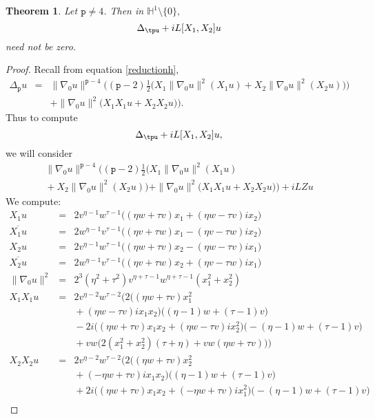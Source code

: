\documentclass[12pt]{amsart}
\theoremstyle{plain}
\newtheorem{theorem}{Theorem}[section]
\theoremstyle{definition}
\numberwithin{equation}{section}
\begin{document}
\begin{theorem} \label{negh}
Let ${\texttt{p}} \neq 4$. Then in $\mathbb{H}^1 \setminus \{0\},$ $$\Delta_\tpu+iL[X_1,X_2]u$$ need not be zero.
\end{theorem}
\begin{proof}
Recall from equation \eqref{reductionh}, 
\begin{eqnarray*}
\Delta_{\texttt{p}} u & = & \|\nabla_{0} u\|^{{\texttt{p}}-4}\bigg(({\texttt{p}}-2)\frac{1}{2}
\Big(X_1\|\nabla_0u\|^2(X_1u)+X_2\|\nabla_0u\|^2(X_2u)\Big)\bigg) \\
&& \mbox{}+\|\nabla_{0} u\|^{2}\big(X_1X_1u+X_2X_2u\big)\bigg).
\end{eqnarray*}
Thus to compute $$\Delta_\tpu+iL[X_1,X_2]u,$$ we will consider 
\begin{eqnarray*}
\|\nabla_{0} u\|^{{\texttt{p}}-4}\bigg(({\texttt{p}}-2)\frac{1}{2}
\Big(X_1\|\nabla_0u\|^2(X_1u)\\
\mbox{}+X_2\|\nabla_0u\|^2(X_2u)\Big) 
+\|\nabla_{0} u\|^{2}\big(X_1X_1u+X_2X_2u\big)\bigg)+iLZu
\end{eqnarray*}
We compute:
\begin{eqnarray*}
X_1u & = & 2v^{\eta-1}w^{\tau-1}\big((\eta w+\tau v)x_1+(\eta w-\tau v)ix_2\big)\\
\overline{X_1u} & = & 2w^{\eta-1}v^{\tau-1}\big((\eta v+\tau w)x_1-(\eta v-\tau w)ix_2\big)\\
X_2u & = & 2v^{\eta-1}w^{\tau-1}\big((\eta w+\tau v)x_2-(\eta w-\tau v)ix_1\big)\\
\overline{X_2u} & = & 2w^{\eta-1}v^{\tau-1}\big((\eta v+\tau w)x_2+(\eta v-\tau w)ix_1\big)\\
\|\nabla_0u\|^2 & = & 2^3(\eta^2+\tau^2)v^{\eta+\tau-1}w^{\eta+\tau-1}(x_1^2+x_2^2)  \\
X_1X_1u & = & 2v^{\eta - 2}w^{\tau - 2} \Big(2\big((\eta w + \tau v)x_1^2 \\ 
& & \mbox{} + (\eta w- \tau v)ix_1x_2\big)\big((\eta - 1)w+ (\tau - 1)v\big) \\
& & \mbox{} -2i\big((\eta w + \tau v)x_1x_2 + (\eta w- \tau v)ix_2^2\big)\big(-(\eta - 1)w+(\tau - 1) v\big)\\
& & \mbox{} +vw\big(2(x_1^2 + x_2^2)(\tau + \eta)+vw(\eta w + \tau v)\big)\Big)\\
X_2X_2u & = & 2v^{\eta - 2} w^{\tau - 2} \Big( 2 \big((\eta w+\tau v)x_2^2 \\ 
& & \mbox{}+ (-\eta w + \tau v)ix_1x_2\big) \big((\eta -1)w+(\tau - 1)v\big)\\ 
& & \mbox{} + 2i \big((\eta w + \tau v)x_1x_2 + (-\eta w + \tau v)ix_1^2\big)\big(-(\eta - 1)w + (\tau - 1)v\big) \\

\end{eqnarray*}
\end{proof}
\end{document}
